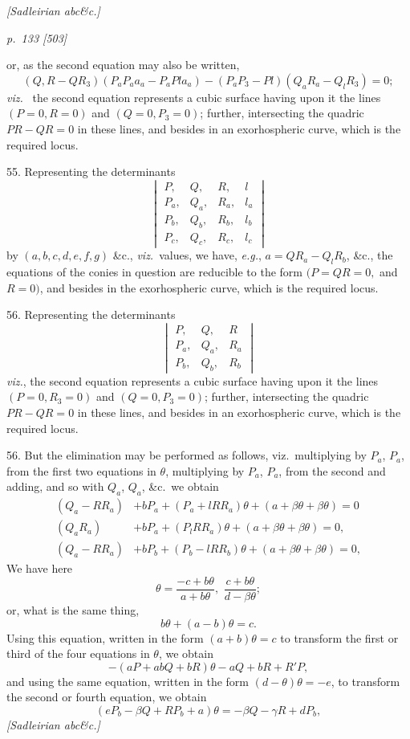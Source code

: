 \documentclass[11pt,a4paper]{book}
\begin{document}
\textit{[Sadleirian abc\&c.]}

\clearpage

\bigskip
\textit{p.~133 [503]}
\smallskip

\noindent
or, as the second equation may also be written,
\[
(Q,R - QR_3)(P_a P_a a_a - P_a Pl a_a) - (P_a P_3 - P l)(Q_a R_a - Q_l R_3) = 0;
\]
\textit{viz.\ } the second equation represents a cubic surface having upon it the lines $(P = 0, R = 0)$
and $(Q = 0, P_3 = 0)$; further, intersecting the quadric $PR - QR = 0$ in these lines, and
besides in an exorhospheric curve, which is the required locus.

55. Representing the determinants
\[
\begin{vmatrix}
P, & Q, & R, & l \\
P_a, & Q_a, & R_a, & l_a \\
P_b, & Q_b, & R_b, & l_b \\
P_c, & Q_c, & R_c, & l_c
\end{vmatrix}
\]
by $(a, b, c, d, e, f, g)$ \&c., \textit{viz.}\ values, we have, \textit{e.g.}, $a = QR_a - Q_l R_b$, &c., the equations of the conies in question are reducible to the form $(P = QR = 0,$ and $R = 0)$, and besides in the exorhospheric curve, which is the required locus.

56. Representing the determinants
\[
\begin{vmatrix}
P, & Q, & R \\
P_a, & Q_a, & R_a \\
P_b, & Q_b, & R_b
\end{vmatrix}
\]
\textit{viz.}, the second equation represents a cubic surface having upon it the lines $(P = 0, R_3 = 0)$
and $(Q = 0, P_3 = 0)$; further, intersecting the quadric $PR - QR = 0$ in these lines, and
besides in an exorhospheric curve, which is the required locus.

56. But the elimination may be performed as follows, viz.\ multiplying by $P_a$, $P_a$,
from the first two equations in $\theta$, multiplying by $P_a$, $P_a$, from the second and adding, and so with $Q_a$, $Q_a$, \&c.\ we obtain
\begin{align*}
(Q_a - RR_a) & + bP_a + (P_a + l RR_a)\theta + (a + \beta\theta + \beta\theta) = 0 \\
(Q_a R_a) & + bP_a + (P_l RR_a)\theta + (a + \beta\theta + \beta\theta) = 0, \\
(Q_a - RR_a) & + bP_b + (P_b - l RR_b)\theta + (a + \beta\theta + \beta\theta) = 0,
\end{align*}
We have here
\[
\theta = \frac{-c + b\theta}{a + b\theta}, \,\,
\frac{c + b\theta}{d - \beta\theta};
\]
or, what is the same thing,
\[
b\theta + (a - b)\theta = c.
\]
Using this equation, written in the form $(a + b)\theta = c$ to transform the first or
third of the four equations in $\theta$, we obtain
\[
-(aP + ab Q + bR)\theta - aQ + bR + R'P,
\]
and using the same equation, written in the form $(d - \theta)\theta = -e$, to transform the
second or fourth equation, we obtain
\[
(eP_b - \beta Q + RP_b + a)\theta = -\beta Q - \gamma R + dP_b,
\]
\textit{[Sadleirian abc\&c.]}
\end{document}
